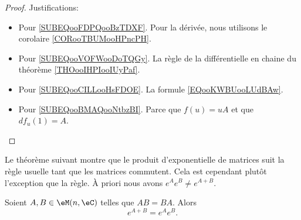 \begin{proof}
	Justifications:
	\begin{itemize}
		\item Pour \ref{SUBEQooFDPQooBzTDXF}. Pour la dérivée, nous utilisons le corolaire \ref{CORooTBUMooHPncPH}.
		\item Pour \ref{SUBEQooVOFWooDoTQGy}. La règle de la différentielle en chaine du théorème \ref{THOooIHPIooIUyPaf}.
		\item Pour \ref{SUBEQooCILLooHsFDOE}. La formule \eqref{EQooKWBUooLUdBAw}.
		\item Pour \ref{SUBEQooBMAQooNtbzBI}. Parce que \( f(u)=uA\) et que \( df_u(1)=A\).
	\end{itemize}
\end{proof}

Le théorème suivant montre que le produit d'exponentielle de matrices suit la règle usuelle tant que les matrices commutent. Cela est cependant plutôt l'exception que la règle. À priori nous avons \(  e^{A} e^{B}\neq  e^{A+B}\).
\begin{theorem}       \label{THOooXCPEooYGyLOp}
	Soient \( A,B\in \eM(n,\eC)\) telles que \( AB=BA\). Alors
	\begin{equation}
		e^{A+B}= e^{A} e^{B}.
	\end{equation}
\end{theorem}

